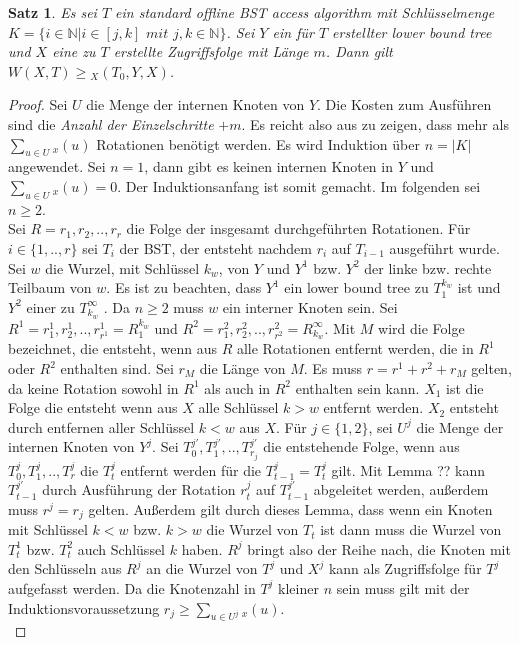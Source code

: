 \documentclass[a4paper,12pt]{article}
\begin{document}
\newtheorem{Satz1}{Satz}[section] \label{satzWilber1}
\begin{Satz1} Es sei $T$ ein standard offline BST access algorithm mit Schlüsselmenge ${K = \{  i \in \mathbb{N} \vert i \in \left[j,k\right] \textit{ mit } j,k \in  \mathbb{N} \}} $. Sei $Y$ ein für $T$ erstellter lower bound tree und $X$ eine zu $T$ erstellte Zugriffsfolge mit Länge $m$. Dann gilt  $W\left(X, T\right) \geq {_X(T_0, Y, X)} $.  
\end{Satz1}
\begin{proof}
Sei $U$ die Menge der internen Knoten von $Y$. Die Kosten zum Ausführen sind die \textit{Anzahl der Einzelschritte} $ + {m}$. Es reicht also aus zu zeigen, dass mehr als $\sum_{u \in U} {_x} (u)$ Rotationen benötigt werden. Es wird Induktion über  $n = \vert K \vert$ angewendet. Sei $n = 1$, dann gibt es keinen internen Knoten in $Y$ und $\sum_{u \in U} {_x} (u) = 0$. Der Induktionsanfang ist somit gemacht. Im folgenden sei $n \geq 2$.\\
Sei $R = r_1,r_2,..,r_r$ die Folge der insgesamt durchgeführten Rotationen. Für $i \in \{1,..,r\}$ sei $T_i$ der BST, der entsteht nachdem $r_i$ auf $T_{i-1}$ ausgeführt wurde. Sei $w$ die Wurzel, mit Schlüssel $k_w$, von $Y$ und $Y^1$ bzw. $Y^2$ der linke bzw. rechte Teilbaum von $w$. Es ist zu beachten, dass $Y^1$ ein lower bound tree zu $T_1^{k_w}$ ist und  $Y^2$ einer zu $T^\infty_{k_w}$ . Da $n \geq 2$ muss $w$ ein interner Knoten sein. Sei  $R^1 = r^1_1,r^1_2,..,r^1_{r^1} = R^{k_w}_1$ und $R^2 = r^2_1,r^2_2,..,r^2_{r^2} = R^\infty_{k_w}$. Mit $M$ wird die Folge bezeichnet, die entsteht, wenn aus $R$ alle Rotationen entfernt werden, die in $R^1$ oder $R^2$ enthalten sind. Sei $r_M$ die Länge von $M$. Es muss $r = r^1 + r^2 + r_M$ gelten, da keine Rotation sowohl in $R^1$ als auch in $R^2$ enthalten sein kann. $X_1$ ist die Folge die entsteht wenn aus $X$ alle Schlüssel $k > w$ entfernt werden. $X_2$ entsteht durch entfernen aller Schlüssel $k < w$ aus $X$. Für $j \in \{1,2\}$, sei $U^j$ die Menge der internen Knoten von $Y^j$. Sei $T^{j'}_0,T^{j'}_1,..,T^{j'}_{r_j}$ die entstehende Folge, wenn aus $T^{j}_0,T^{j}_1,..,T^{j}_{r}$ die $T^j_t$ entfernt werden für die $T^j_{t-1} = T^j_t$ gilt. Mit Lemma ?? kann  $T^{j'}_{t-1}$ durch Ausführung der Rotation $r^j_t$ auf $T^{j'}_{t-1}$ abgeleitet werden, außerdem muss $r^j= r_j$ gelten. Außerdem gilt durch dieses Lemma, dass wenn ein Knoten mit Schlüssel $k < w$ bzw. $k > w$ die Wurzel von $T_t$ ist dann muss die Wurzel von $T^1_t$ bzw. $T^2_t$ auch Schlüssel $k$ haben. $R^j$ bringt also der Reihe nach, die Knoten mit den Schlüsseln aus $R^j$ an die Wurzel von $T^j$ und  $X^j$ kann als Zugriffsfolge für $T^j$ aufgefasst werden. Da die Knotenzahl in $T^j$ kleiner $n$ sein muss gilt mit der Induktionsvoraussetzung  $r_j \geq \sum_{u \in U^j} {_x} (u)$.\\

\end{proof}
\end{document}
